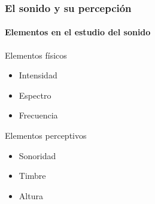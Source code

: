 \documentclass[12 pt]{beamer}
\begin{document}
\begin{frame}
    \frametitle{El sonido y su percepción}
    \framesubtitle{Elementos en el estudio del sonido}
    
    \begin{alertblock}{Elementos físicos}
        \begin{itemize}
            \item Intensidad
            \item Espectro
            \item Frecuencia
        \end{itemize}
    \end{alertblock}
    
    \pause
    
    \begin{exampleblock}{Elementos perceptivos}
        \begin{itemize}
            \item Sonoridad
            \item Timbre
            \item Altura
        \end{itemize}
    \end{exampleblock}
    
    \end{frame}
    
\end{document}
